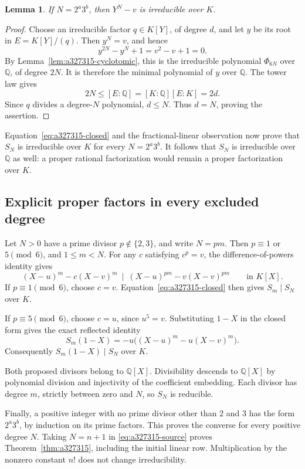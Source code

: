 \documentclass[11pt]{article}
\newtheorem{lemma}[theorem]{Lemma}
\begin{document}
\begin{lemma}
\label{lem:a327315-binomial}
If $N=2^a3^b$, then $Y^N-v$ is irreducible over $K$.
\end{lemma}
\begin{proof}
Choose an irreducible factor $q\in K[Y]$, of degree $d$, and let $y$ be
its root in $E=K[Y]/(q)$.  Then $y^N=v$, and hence
\[
 y^{2N}-y^N+1=v^2-v+1=0.
\]
By Lemma~\ref{lem:a327315-cyclotomic}, this is the irreducible polynomial
$\Phi_{6N}$ over $\mathbb Q$, of degree $2N$.  It is therefore the
minimal polynomial of $y$ over $\mathbb Q$.  The tower law gives
\[
 2N\le[E:\mathbb Q]=[K:\mathbb Q][E:K]=2d.
\]
Since $q$ divides a degree-$N$ polynomial, $d\le N$.  Thus $d=N$, proving
the assertion.
\end{proof}

Equation~\eqref{eq:a327315-closed} and the fractional-linear observation
now prove that $S_N$ is irreducible over $K$ for every $N=2^a3^b$.
It follows that $S_N$ is irreducible over $\mathbb Q$ as well: a proper
rational factorization would remain a proper factorization over $K$.

\subsection{Explicit proper factors in every excluded degree}

Let $N>0$ have a prime divisor $p\notin\{2,3\}$, and write $N=pm$.
Then $p\equiv1$ or $5\pmod6$, and $1\le m<N$.
For any $c$ satisfying $c^p=v$, the difference-of-powers identity gives
\[
 (X-u)^m-c(X-v)^m
 \ \mid\ (X-u)^{pm}-v(X-v)^{pm}
 \qquad\text{in }K[X].
\]
If $p\equiv1\pmod6$, choose $c=v$.  Equation~\eqref{eq:a327315-closed}
then gives $S_m\mid S_N$ over $K$.

If $p\equiv5\pmod6$, choose $c=u$, since $u^5=v$.  Substituting $1-X$
in the closed form gives the exact reflected identity
\[
 S_m(1-X)=-u\big((X-u)^m-u(X-v)^m\big).
\]
Consequently $S_m(1-X)\mid S_N$ over $K$.

Both proposed divisors belong to $\mathbb Q[X]$.  Divisibility descends
to $\mathbb Q[X]$ by polynomial division and injectivity of the
coefficient embedding.  Each divisor has degree $m$, strictly between
zero and $N$, so $S_N$ is reducible.

Finally, a positive integer with no prime divisor other than 2 and 3
has the form $2^a3^b$, by induction on its prime factors.  This proves
the converse for every positive degree $N$.  Taking $N=n+1$ in
\eqref{eq:a327315-source} proves Theorem~\ref{thm:a327315}, including
the initial linear row.  Multiplication by the nonzero constant $n!$
does not change irreducibility.
\end{document}
